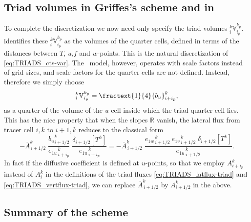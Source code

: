 \documentclass[../main/NEMO_manual]{subfiles}
\begin{document}
\subsection{Triad volumes in Griffes's scheme and in \NEMO}

To complete the discretization we now need only specify the triad volumes $_i^k\mathbb{V}_{i_p}^{k_p}$.
\citet{griffies.gnanadesikan.ea_JPO98} identifies these $_i^k\mathbb{V}_{i_p}^{k_p}$ as the volumes of the quarter cells,
defined in terms of the distances between $T$, $u$,$f$ and $w$-points.
This is the natural discretization of \autoref{eq:TRIADS_cts-var}.
The \NEMO\ model, however, operates with scale factors instead of grid sizes,
and scale factors for the quarter cells are not defined.
Instead, therefore we simply choose
\begin{equation}
  \label{eq:TRIADS_V-NEMO}
  _i^k\mathbb{V}_{i_p}^{k_p}=\fractext{1}{4} {b_u}_{i+i_p}^k,
\end{equation}
as a quarter of the volume of the $u$-cell inside which the triad quarter-cell lies.
This has the nice property that when the slopes $\mathbb{R}$ vanish,
the lateral flux from tracer cell $i,k$ to $i+1,k$ reduces to the classical form
\begin{equation}
  \label{eq:TRIADS_lat-normal}
  -\overline{A}_{\,i+1/2}^k\;
  \frac{{b_u}_{i+1/2}^k}{{e_{1u}}_{\,i + i_p}^{\,k}}
  \;\frac{\delta_{i+ 1/2}[T^k] }{{e_{1u}}_{\,i + i_p}^{\,k}}
  = -\overline{A}_{\,i+1/2}^k\;\frac{{e_{1w}}_{\,i + 1/2}^{\,k}\:{e_{1v}}_{\,i + 1/2}^{\,k}\;\delta_{i+ 1/2}[T^k]}{{e_{1u}}_{\,i + 1/2}^{\,k}}.
\end{equation}
In fact if the diffusive coefficient is defined at $u$-points,
so that we employ ${A}_{i+i_p}^k$ instead of  ${A}_i^k$ in the definitions of the triad fluxes
\autoref{eq:TRIADS_latflux-triad} and \autoref{eq:TRIADS_vertflux-triad},
we can replace $\overline{A}_{\,i+1/2}^k$ by $A_{i+1/2}^k$ in the above.

\subsection{Summary of the scheme}
\end{document}
